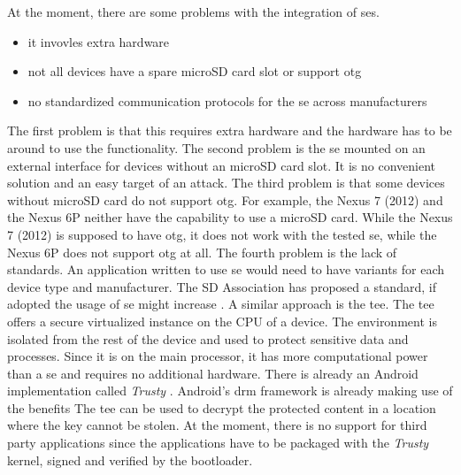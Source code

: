 \newpage
At the moment, there are some problems with the integration of \gls{se}s.
\begin{itemize}
  \item it invovles extra hardware
  \item not all devices have a spare microSD card slot or support \gls{otg}
  \item no standardized communication protocols for the \gls{se} across manufacturers
\end{itemize}
The first problem is that this requires extra hardware and the hardware has to be around to use the functionality.
\newline
The second problem is the \gls{se} mounted on an external interface for devices without an microSD card slot.
It is no convenient solution and an easy target of an attack.
\newline
The third problem is that some devices without microSD card do not support \gls{otg}.
For example, the Nexus 7 (2012) and the Nexus 6P neither have the capability to use a microSD card.
While the Nexus 7 (2012) is supposed to have \gls{otg}, it does not work with the tested \gls{se}, while the Nexus 6P does not support \gls{otg} at all.
\newline
The fourth problem is the lack of standards.
An application written to use \gls{se} would need to have variants for each device type and manufacturer.
The SD Association has proposed a standard, if adopted the usage of \gls{se} might increase \cite{smartSD}.
\newline
\newline
A similar approach is the \gls{tee}.
The \gls{tee} offers a secure virtualized instance on the CPU of a device.
The environment is isolated from the rest of the device and used to protect sensitive data and processes.
Since it is on the main processor, it has more computational power than a \gls{se} and requires no additional hardware.
There is already an Android implementation called \textit{Trusty} \cite{trusty}.
Android’s \gls{drm} framework is already making use of the benefits
The \gls{tee} can be used to decrypt the protected content in a location where the key cannot be stolen.
At the moment, there is no support for third party applications since the applications have to be packaged with the \textit{Trusty} kernel, signed and verified by the bootloader. \cite{trusty} \cite{teeGlobal}

